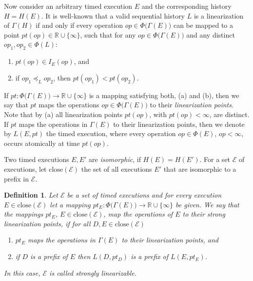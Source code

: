 \documentclass[11pt,letterpaper]{article}
\newtheorem{definition}[theorem]{Definition}
\newcommand{\EE}{\mathcal{E}}
\newcommand{\close}[1]{\ensuremath{\text{close}\left(#1\right)}}
\begin{document}
Now consider an arbitrary timed execution $E$ and the corresponding history $H=H(E)$.
It is well-known that a valid sequential history $L$ is a linearization of $\Gamma(H)$ if and only if
every operation $op\in \Phi\bigl(\Gamma(E)\bigr)$ can be mapped to a point $pt(op)\in\mathds{R}\cup\{\infty\}$, such that for any $op\in \Phi\bigl(\Gamma(E)\bigr)$ and any distinct $op_1,op_2\in \Phi(L)$:
\begin{enumerate}
\item[(a)] $pt(op)\in I_{E}(op)$, and
\item[(b)] if $op_1\preceq_L op_2$, then $pt(op_1)< pt(op_2)$.
\end{enumerate}

If $pt:\Phi\bigl(\Gamma(E)\bigr)\to\mathds{R}\cup\{\infty\}$ is a mapping satisfying both, (a) and (b), then we say that $pt$ maps the operations $op\in\Phi\bigl(\Gamma(E)\bigr)$ to their \emph{linearization points}.
Note that by (a) all linearization points $pt(op)$, with $pt(op)<\infty$, are distinct.
If $pt$ maps the operations in $\Gamma(E)$ to their linearization points, then we denote by $L(E,pt)$ the timed execution, where every operation $op\in\Phi(E)$, $op<\infty$, occurs atomically at time $pt(op)$.

Two timed executions $E,E'$ are \emph{isomorphic}, if $H(E)=H(E')$.
For a set $\EE$ of executions, let $\close{\EE}$ the set of all executions $E'$ that are isomorphic to a prefix in $\EE$.

\begin{definition}\label{def:slm}
Let $\EE$ be a set of timed executions and for every execution $E\in\close{\EE}$ let a mapping $pt_E:\Phi\bigl(\Gamma(E)\bigr)\rightarrow\mathds{R}\cup\{\infty\}$ be given.
We say that the mappings $pt_E$, $E\in\close{\EE}$, map the operations of $E$ to their \emph{strong linearization points}, if for all $D,E\in\close{\EE}$
  \begin{enumerate}
  \item[$(L')$] $pt_E$ maps the operations in $\Gamma(E)$ to their linearization points, and
  \item[$(P')$]
    if $D$ is a prefix of $E$ then $L(D,pt_D)$ is a prefix of $L(E,pt_E)$.
  \end{enumerate}
  In this case, $\EE$ is called \emph{strongly linearizable}.
\end{definition}
\end{document}
